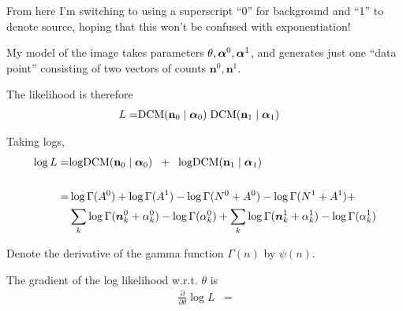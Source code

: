 \documentclass[12pt]{article}
\renewcommand{\vec}[1]{\mathbf{#1}}
\newcommand{\balpha}{\mbox{\boldmath $\alpha$}}
\newcommand{\bn}{\mbox{\boldmath $n$}}
\begin{document}
From here I'm switching to using a superscript ``0'' for background
and ``1'' to denote source, hoping that this won't be confused with
exponentiation!

My model of the image takes parameters $\theta, \balpha^0, \balpha^1$,
and generates just one ``data point'' consisting of two vectors of
counts $\vec{n}^0,\vec{n}^1$. 


The likelihood is therefore
\begin{align}
L =& \text{DCM}(\vec{n}_0 \mid \balpha_0) \; \text{DCM}(\vec{n}_1 \mid \balpha_1) 
\end{align}

Taking logs,
\begin{align*}
\log L =& \text{logDCM}(\vec{n}_0 \mid \balpha_0) \;\; + \;\; \text{logDCM}(\vec{n}_1 \mid \balpha_1) \\ \\
 =& \log \Gamma(A^0) +\log \Gamma(A^1) - \log \Gamma(N^0+A^0)  - \log \Gamma(N^1+A^1) + \\ & \sum_k \log \Gamma(\bn^0_k + \alpha_k^0) - \log \Gamma(\alpha_k^0) + \sum_k \log \Gamma(\bn^1_k + \alpha_k^1) - \log \Gamma(\alpha_k^1) 
\end{align*}

Denote the derivative of the gamma function $\Gamma(n)$ by $\psi(n)$.

The gradient of the log likelihood w.r.t. $\theta$ is
\begin{align}
\frac{\partial}{\partial \theta} 
\log L &= 
\end{align}
\end{document}
